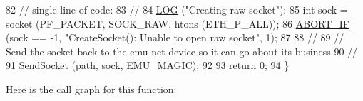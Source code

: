 \begin{DoxyCode}
82   \textcolor{comment}{// single line of code:}
83   \textcolor{comment}{//}
84   \hyperlink{creator-utils_8h_a158a8c64f24645c7478298399825737f}{LOG} (\textcolor{stringliteral}{"Creating raw socket"});
85   \textcolor{keywordtype}{int} sock = socket (PF\_PACKET, SOCK\_RAW, htons (ETH\_P\_ALL));
86   \hyperlink{creator-utils_8h_a91c11c90ad2f1672fbd3c031038dce16}{ABORT\_IF} (sock == -1, \textcolor{stringliteral}{"CreateSocket(): Unable to open raw socket"}, 1);
87 
88   \textcolor{comment}{//}
89   \textcolor{comment}{// Send the socket back to the emu net device so it can go about its business}
90   \textcolor{comment}{//}
91   \hyperlink{tap-creator_8cc_a11a114b8401a27939e87a94ade65213a}{SendSocket} (path, sock, \hyperlink{raw-sock-creator_8cc_adc226a140a49fe19a57e21bbe86341e4}{EMU\_MAGIC});
92 
93   \textcolor{keywordflow}{return} 0;
94 \}
\end{DoxyCode}


Here is the call graph for this function\+:


